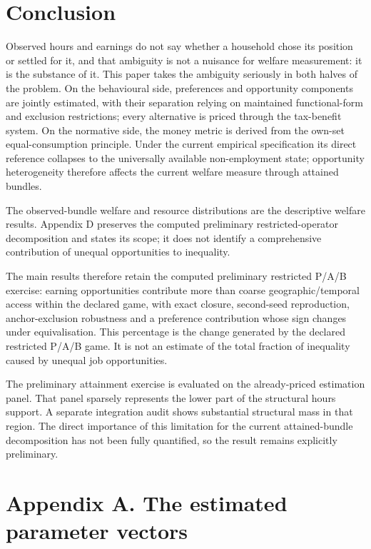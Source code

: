 \documentclass[11pt,a4paper]{article}
\begin{document}
\section{Conclusion}\label{conclusion}

Observed hours and earnings do not say whether a household chose its position or settled for it, and that ambiguity is not a nuisance for welfare measurement: it is the substance of it. This paper takes the ambiguity seriously in both halves of the problem. On the behavioural side, preferences and opportunity components are jointly estimated, with their separation relying on maintained functional-form and exclusion restrictions; every alternative is priced through the tax-benefit system. On the normative side, the money metric is derived from the own-set equal-consumption principle. Under the current empirical specification its direct reference collapses to the universally available non-employment state; opportunity heterogeneity therefore affects the current welfare measure through attained bundles.

The observed-bundle welfare and resource distributions are the descriptive welfare results. Appendix D preserves the computed preliminary restricted-operator decomposition and states its scope; it does not identify a comprehensive contribution of unequal opportunities to inequality.

The main results therefore retain the computed preliminary restricted P/A/B exercise: earning opportunities contribute more than coarse geographic/temporal access within the declared game, with exact closure, second-seed reproduction, anchor-exclusion robustness and a preference contribution whose sign changes under equivalisation. This percentage is the change generated by the declared restricted P/A/B game. It is not an estimate of the total fraction of inequality caused by unequal job opportunities.

The preliminary attainment exercise is evaluated on the already-priced estimation panel. That panel sparsely represents the lower part of the structural hours support. A separate integration audit shows substantial structural mass in that region. The direct importance of this limitation for the current attained-bundle decomposition has not been fully quantified, so the result remains explicitly preliminary.

\appendix

\section{Appendix A. The estimated parameter vectors}\label{appendix-a.-the-estimated-parameter-vectors}
\end{document}

